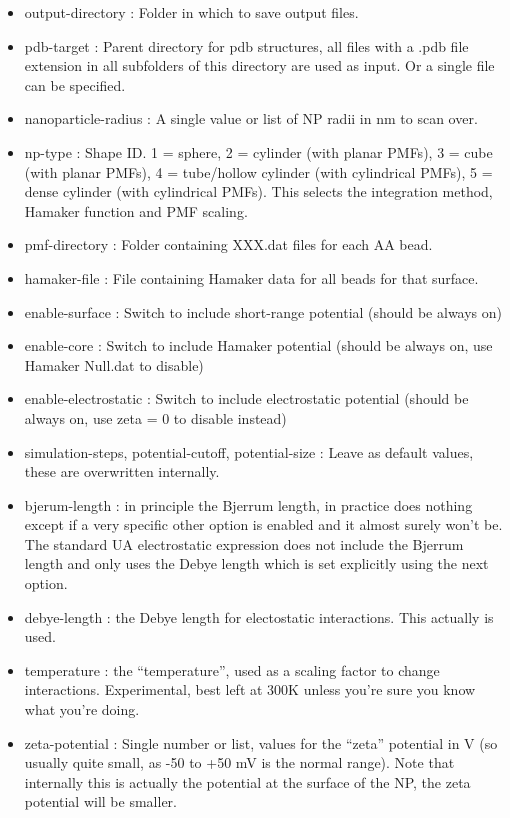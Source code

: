 \documentclass[10pt,a4paper,onecolumn]{report}
\begin{document}
\begin{itemize}
\item output-directory : Folder in which to save output files. 
\item pdb-target : Parent directory for pdb structures, all files with a .pdb file extension  in all subfolders of this directory are used as input. Or a single file can be specified. 
\item nanoparticle-radius : A single value or list of NP radii in nm to scan over.
\item np-type : Shape ID. 1 = sphere, 2 = cylinder (with planar PMFs), 3 = cube (with planar PMFs), 4 = tube/hollow cylinder (with cylindrical PMFs), 5 = dense cylinder (with cylindrical PMFs). This selects the integration method, Hamaker function and PMF scaling.
\item pmf-directory : Folder containing XXX.dat files for each AA bead.
\item hamaker-file : File containing Hamaker data for all beads for that surface.
\item enable-surface : Switch to include short-range potential (should be always on)
\item enable-core : Switch to include Hamaker potential (should be always on, use Hamaker Null.dat to disable)
\item enable-electrostatic : Switch to include electrostatic potential (should be always on, use zeta = 0 to disable instead)
\item simulation-steps, potential-cutoff, potential-size : Leave as default values, these are overwritten internally. 
\item bjerum-length : in principle the Bjerrum length, in practice does nothing except if a very specific other option is enabled and it almost surely won't be. The standard UA electrostatic expression does not include the Bjerrum length and only uses the Debye length which is set explicitly using the next option.    
\item debye-length : the Debye length for electostatic interactions. This actually is used. 
\item temperature : the ``temperature'', used as a scaling factor to change interactions. Experimental, best left at 300K unless you're sure you know what you're doing. 
\item zeta-potential : Single number or list, values for the ``zeta'' potential in V (so usually quite small, as -50 to +50 mV is the normal range). Note that internally this is actually the potential at the surface of the NP, the zeta potential will be smaller. 
\end{itemize}
\end{document}
